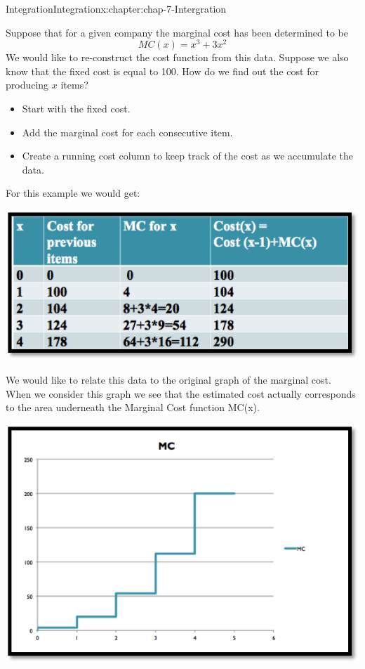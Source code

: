 \documentclass[oneside,10pt,]{book}
\numberwithin{equation}{section}
\begin{document}
\begin{chapterptx}{Integration}{}{Integration}{}{}{x:chapter:chap-7-Intergration}
\begin{introduction}{}%
Suppose that for a given company the marginal cost has been determined to be%
%
\begin{equation*}
MC(x)=x^3+3x^2
\end{equation*}
We would like to re-construct the cost function from this data. Suppose we also know that the fixed cost is equal to \textdollar{}100. How do we find out the cost for producing \(x\) items?%
%
\begin{itemize}[label=\textbullet]
\item{}Start with the fixed cost.%
\item{}Add the marginal cost for each consecutive item.%
\item{}Create a running cost column to keep track of the cost as we accumulate the data.%
\end{itemize}
For this example we would get:%
\begin{sidebyside}{1}{0.1}{0.1}{0}%
\begin{sbspanel}{0.8}%
\includegraphics[width=\linewidth]{images/sec7-0-1.png}
\end{sbspanel}%
\end{sidebyside}%
\par
We would like to relate this data to the original graph of the marginal cost. When we consider this graph we see that the estimated cost actually corresponds to the area underneath the Marginal Cost function MC(x).%
\begin{sidebyside}{1}{0.2}{0.2}{0}%
\begin{sbspanel}{0.6}%
\includegraphics[width=\linewidth]{images/sec7-0-2.png}

\end{sbspanel}
\end{sidebyside}
\end{introduction}
\end{chapterptx}
\end{document}

